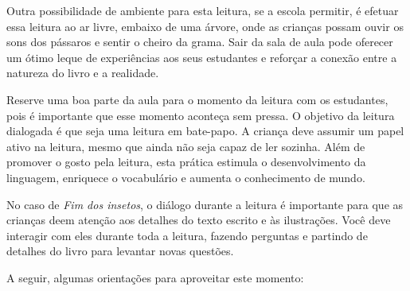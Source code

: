 \documentclass[11pt]{extarticle}
\begin{document}

Outra possibilidade de ambiente para esta leitura, se a escola permitir, 
é efetuar essa leitura ao ar livre, embaixo de uma árvore, onde as crianças 
possam ouvir os sons dos pássaros e sentir o cheiro da grama. Sair da sala 
de aula pode oferecer um ótimo leque de experiências aos seus estudantes e 
reforçar a conexão entre a natureza do livro e a realidade.  

Reserve uma boa parte da aula para o momento da leitura com os estudantes, 
pois é importante que esse momento aconteça sem pressa. O objetivo da 
leitura dialogada é que seja uma leitura em bate-papo. A criança deve 
assumir um papel ativo na leitura, mesmo que ainda não seja capaz de 
ler sozinha. Além de promover o gosto pela leitura, esta prática estimula 
o desenvolvimento da linguagem, enriquece o vocabulário e 
aumenta o conhecimento de mundo.

No caso de \textit{Fim dos insetos}, o diálogo durante a leitura é 
importante para que as crianças deem atenção aos detalhes
do texto escrito e às ilustrações.
Você deve interagir com eles durante toda a 
leitura, fazendo perguntas e partindo de detalhes do livro para 
levantar novas questões. 

A seguir, algumas orientações para aproveitar este momento: 
\end{document}
